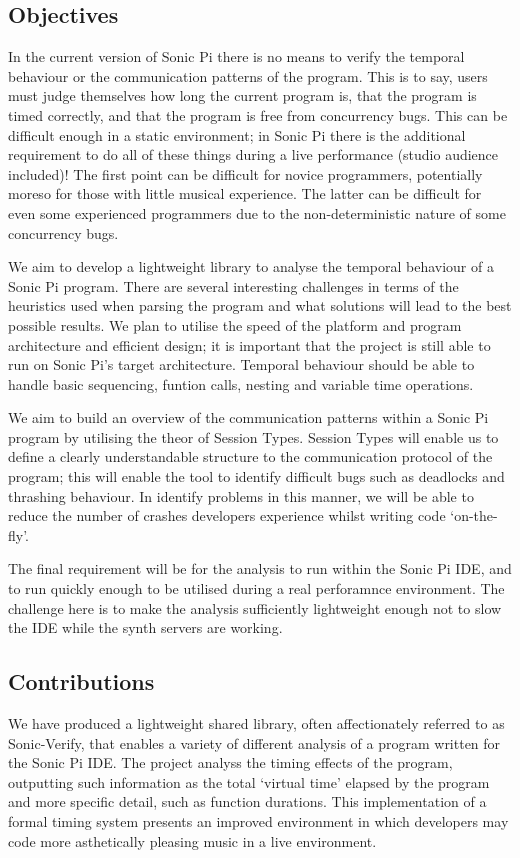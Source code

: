 \documentclass[11pt, abstracton, twoside, titlepage=true]{scrartcl}
\begin{document}
\subsection{Objectives}
In the current version of Sonic Pi \cite{sp} there is no means to verify the 
temporal behaviour or the communication patterns of the program. This is to say, 
users must judge themselves how long the current program is, that the program is 
timed correctly, and that the program is free from concurrency bugs. This can be 
difficult enough in a static environment; in Sonic Pi there is the additional 
requirement to do all of these things during a live performance (studio audience 
included)! The first point can be difficult for novice programmers, potentially 
moreso for those with little musical experience. The latter can be difficult for 
even some experienced programmers due to the non-deterministic nature of some 
concurrency bugs.

We aim to develop a lightweight library to analyse the temporal behaviour of a 
Sonic Pi program. There are several interesting challenges in terms of 
the heuristics used when parsing the program and what solutions will lead to the 
best possible results. We plan to utilise the speed of the platform and program 
architecture and efficient design; it is important that the project is still 
able to run on Sonic Pi's target architecture. Temporal behaviour should be able 
to handle basic sequencing, funtion calls, nesting and variable time operations. 

We aim to build an overview of the communication patterns within a Sonic Pi program 
by utilising the theor of Session Types. Session Types will
enable us to define a clearly understandable structure to the communication
protocol of the program; this will enable the tool to identify difficult bugs
such as deadlocks and thrashing behaviour. In identify problems in this manner,
we will be able to reduce the number of crashes developers experience whilst 
writing code `on-the-fly'. 

The final requirement will be for the analysis to run within the Sonic Pi IDE, 
and to run quickly enough to be utilised during a real perforamnce environment. 
The challenge here is to make the analysis sufficiently lightweight enough not to
slow the IDE while the synth servers are working. 

\subsection{Contributions}
We have produced a lightweight shared library, often affectionately referred to 
as Sonic-Verify, that enables a variety of different analysis of a program 
written for the Sonic Pi IDE. The project analyss the timing effects of the 
program, outputting such information as the total `virtual time' elapsed by the 
program and more specific detail, such as function durations. This implementation
of a formal timing system presents an improved environment in which developers
may code more asthetically pleasing music in a live environment.
\end{document}
